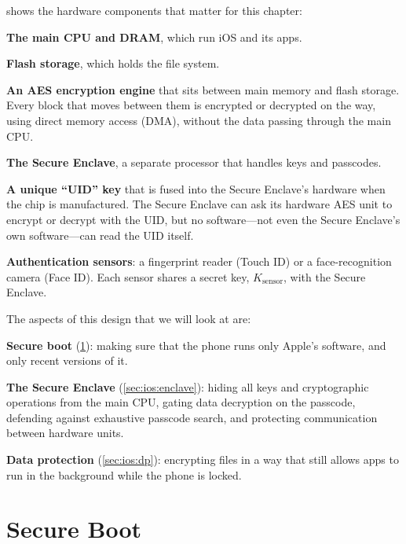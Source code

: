  shows the hardware components that matter for this
chapter:
\begin{compactitem}
  \item \textbf{The main CPU and DRAM}, which run iOS and its apps.
  \item \textbf{Flash storage}, which holds the file system.
  \item \textbf{An AES encryption engine} that sits between main
        memory and flash storage.
        Every block that moves between them is encrypted or decrypted
        on the way, using direct memory access (DMA), without the data
        passing through the main CPU.
  \item \textbf{The Secure Enclave}, a separate processor that handles
        keys and passcodes.
  \item \textbf{A unique ``UID'' key} that is fused into the Secure
        Enclave's hardware when the chip is manufactured.
        The Secure Enclave can ask its hardware AES unit to encrypt or
        decrypt with the UID, but no software---not even the Secure
        Enclave's own software---can read the UID itself.
  \item \textbf{Authentication sensors}: a fingerprint reader (Touch ID)
        or a face-recognition camera (Face ID).
        Each sensor shares a secret key, $K_\text{sensor}$, with the
        Secure Enclave.
\end{compactitem}

The aspects of this design that we will look at are:
\begin{compactenum}
  \item \textbf{Secure boot} (\cref{sec:ios:boot}): making sure that the
        phone runs only Apple's software, and only recent versions of it.
  \item \textbf{The Secure Enclave} (\cref{sec:ios:enclave}): hiding all
        keys and cryptographic operations from the main CPU, gating data
        decryption on the passcode, defending against exhaustive passcode
        search, and protecting communication between hardware units.
  \item \textbf{Data protection} (\cref{sec:ios:dp}): encrypting files
        in a way that still allows apps to run in the background while the
        phone is locked.
\end{compactenum}

\section{Secure Boot}
\label{sec:ios:boot}

